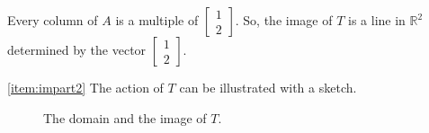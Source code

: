 \documentclass{ximera}
\newcommand{\RR}{\mathbb{R}}
\begin{document}
\begin{example}
\begin{explanation}
Every column of $A$ is a multiple of $\begin{bmatrix}1\\2\end{bmatrix}$.  So, the image of $T$ is a line in $\RR^2$ determined by the vector $\begin{bmatrix}1\\2\end{bmatrix}$.

\ref{item:impart2} The action of $T$ can be illustrated with a sketch.

\begin{figure}[h]
\centering
{}
\caption{The domain and the image of $T$.}
  \label{fig:actionofst} 
\end{figure}


\end{explanation}
\end{example}
\end{document}
